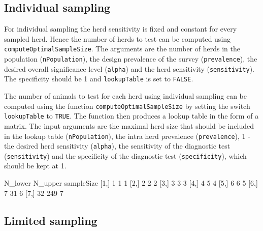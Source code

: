 \documentclass[nojss]{jss}
\begin{document}
\subsection{Individual sampling} \label{subsec:ind-sampling-noclass}

For individual sampling the herd sensitivity is fixed and constant 
for every sampled herd. Hence the number of herds to test can be 
computed using \texttt{computeOptimalSampleSize}. The arguments are 
the number of herds in the population (\texttt{nPopulation}), the 
design prevalence of the survey (\texttt{prevalence}), the desired 
overall significance level (\texttt{alpha}) and the herd sensitivity 
(\texttt{sensitivity}). The specificity should be 1 and 
\texttt{lookupTable} is set to \texttt{FALSE}. 

The number of animals to test for each herd using individual 
sampling can be computed using the function 
\texttt{computeOptimalSampleSize} by setting the switch 
\texttt{lookupTable} to \texttt{TRUE}. The function then produces a 
lookup table in the form of a matrix. The input arguments are the 
maximal herd size that should be included in the  lookup table 
(\texttt{nPopulation}), the intra herd prevalence 
(\texttt{prevalence}), 1 - the desired herd sensitivity 
(\texttt{alpha}), the sensitivity of the diagnostic test 
(\texttt{sensitivity}) and the specificity of the diagnostic test 
(\texttt{specificity}), which should be kept at 1. 

\begin{Schunk}
\begin{Soutput}
     N_lower N_upper sampleSize
[1,]       1       1          1
[2,]       2       2          2
[3,]       3       3          3
[4,]       4       5          4
[5,]       6       6          5
[6,]       7      31          6
[7,]      32     249          7
\end{Soutput}
\end{Schunk}



\subsection{Limited sampling} \label{subsec:ltd-sampling-noclass}  
\end{document}
